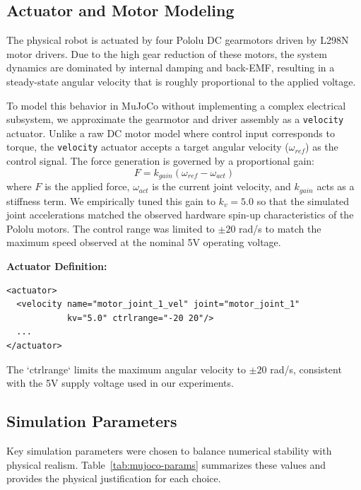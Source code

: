 \documentclass[11pt, a4paper]{article}
\begin{document}
\subsection{Actuator and Motor Modeling}
\label{subsec:motor-modeling}
The physical robot is actuated by four Pololu DC gearmotors driven by L298N motor drivers. Due to the high gear reduction of these motors, the system dynamics are dominated by internal damping and back-EMF, resulting in a steady-state angular velocity that is roughly proportional to the applied voltage.

To model this behavior in MuJoCo without implementing a complex electrical subsystem, we approximate the gearmotor and driver assembly as a \texttt{velocity} actuator. Unlike a raw DC motor model where control input corresponds to torque, the \texttt{velocity} actuator accepts a target angular velocity ($\omega_{ref}$) as the control signal. The force generation is governed by a proportional gain:
\begin{equation}
    F = k_{gain} (\omega_{ref} - \omega_{act})
\end{equation}
where $F$ is the applied force, $\omega_{act}$ is the current joint velocity, and $k_{gain}$ acts as a stiffness term. We empirically tuned this gain to $k_v = 5.0$ so that the simulated joint accelerations matched the observed hardware spin-up characteristics of the Pololu motors. The control range was limited to $\pm 20$ rad/s to match the maximum speed observed at the nominal 5V operating voltage.

\textbf{Actuator Definition:}
\begin{verbatim}
<actuator>
  <velocity name="motor_joint_1_vel" joint="motor_joint_1" 
            kv="5.0" ctrlrange="-20 20"/>
  ...
</actuator>
\end{verbatim}
The `ctrlrange` limits the maximum angular velocity to $\pm 20$ rad/s, consistent with the 5V supply voltage used in our experiments.

\subsection{Simulation Parameters}
\label{subsec:sim-params}
Key simulation parameters were chosen to balance numerical stability with physical realism. Table~\ref{tab:mujoco-params} summarizes these values and provides the physical justification for each choice.
\end{document}
